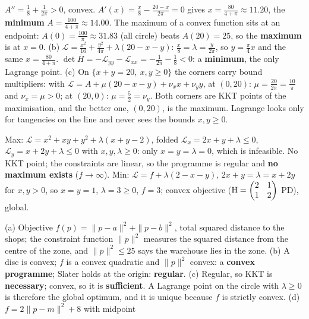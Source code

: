 \begin{solutions}
        $A''=\tfrac18+\tfrac1{2\pi}>0$, convex. $A'(x)=\tfrac x8-\tfrac{20-x}{2\pi}=0$
        gives $x=\tfrac{80}{4+\pi}\approx11.20$, the \textbf{minimum}
        $A=\tfrac{100}{4+\pi}\approx14.00$. The maximum of a convex function
        sits at an endpoint: $A(0)=\tfrac{100}{\pi}\approx31.83$ (all circle)
        beats $A(20)=25$, so the \textbf{maximum} is at $x=0$.
        (b) $\mathcal{L}=\tfrac{x^{2}}{16}+\tfrac{y^{2}}{4\pi}+\lambda(20-x-y)$:
        $\tfrac x8=\lambda=\tfrac{y}{2\pi}$, so $y=\tfrac{\pi}{4}x$ and the
        same $x=\tfrac{80}{4+\pi}$. $\det\overline{H}=-\mathcal{L}_{yy}-\mathcal{L}_{xx}
        =-\tfrac1{2\pi}-\tfrac18<0$: a \textbf{minimum}, the only Lagrange
        point. (c) On $\{x+y=20,\ x,y\ge0\}$ the corners carry
        bound multipliers: with
        $\mathcal{L}=A+\mu(20-x-y)+\nu_xx+\nu_yy$, at $(0,20)$:
        $\mu=\tfrac{20}{2\pi}=\tfrac{10}\pi$ and $\nu_x=\mu>0$; at $(20,0)$:
        $\mu=\tfrac52=\nu_y$. Both corners are KKT points of the maximisation,
        and the better one, $(0,20)$, is the maximum. Lagrange looks only for
        tangencies on the line and never sees the bounds $x,y\ge0$.
  \item Max: $\mathcal{L}=x^{2}+xy+y^{2}+\lambda(x+y-2)$, folded
        $\mathcal{L}_x=2x+y+\lambda\le0$, $\mathcal{L}_y=x+2y+\lambda\le0$
        with $x,y,\lambda\ge0$: only $x=y=\lambda=0$, which is infeasible.
        No KKT point; the constraints are linear, so the programme is
        regular and \textbf{no maximum exists} ($f\to\infty$).
        Min: $\mathcal{L}=f+\lambda(2-x-y)$, $2x+y=\lambda=x+2y$ for
        $x,y>0$, so $x=y=1$, $\lambda=3\ge0$, $f=3$; convex objective
        ($\operatorname{H}=\begin{pmatrix}2&1\\1&2\end{pmatrix}$ PD), global.
  \item (a) Objective $f(p)=\|p-a\|^{2}+\|p-b\|^{2}$, total squared
        distance to the shops; the constraint function $\|p\|^{2}$ measures
        the squared distance from the centre of the zone, and
        $\|p\|^{2}\le25$ says the warehouse lies in the zone. (b) A disc is
        convex; $f$ is a convex quadratic and $\|p\|^{2}$ convex: a
        \textbf{convex programme}; Slater holds at the origin:
        \textbf{regular}. (c) Regular, so KKT is \textbf{necessary}; convex,
        so it is \textbf{sufficient}. A Lagrange point on the circle with
        $\lambda\ge0$ is therefore the global optimum, and it is unique
        because $f$ is strictly convex. (d) $f=2\|p-m\|^{2}+8$ with midpoint

\end{solutions}

